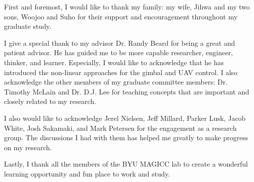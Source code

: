 \afterpage{\cleardoublepage}
%
First and foremost, I would like to thank my family: my wife, Jihwa and my two sons, Woojoo and Suho for their support and encouragement throughout my graduate study.

I give a special thank to my advisor Dr. Randy Beard for being a great and patient advisor. He has guided me to be more capable researcher, engineer, thinker, and learner. Especially, I would like to acknowledge that he has introduced the non-linear approaches for the gimbal and UAV control. I also acknowledge the other members of my graduate committee members: Dr. Timothy McLain and Dr. D.J. Lee for teaching concepts that are important and closely related to my research.

I also would like to acknowledge Jerel Nielsen, Jeff Millard, Parker Lusk, Jacob White, Josh Sakamaki, and Mark Petersen for the engagement as a research group. The discussions I had with them has helped me greatly to make progress on my research.

Lastly, I thank all the members of the BYU MAGICC lab to create a wonderful learning opportunity and fun place to work and study.
